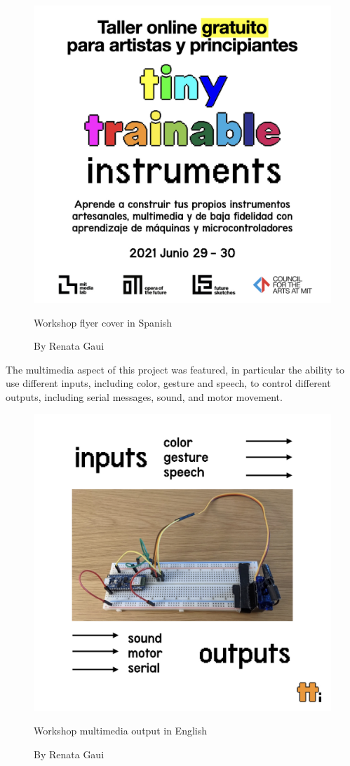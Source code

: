 \begin{figure}[h]
  \centering
  \includegraphics[width=0.75\linewidth,height=0.35\textheight,keepaspectratio]{images/workshop-es-1.jpg}
  \caption{Workshop flyer cover in Spanish}
  \caption*{By Renata Gaui}
  \label{fig:workshop-spanish-flyer-page-1}
\end{figure}

The multimedia aspect of this project was featured, in particular the ability to use different inputs, including color, gesture and speech, to control different outputs, including serial messages, sound, and motor movement.

\begin{figure}[h]
  \centering
  \includegraphics[width=0.75\linewidth,height=0.35\textheight,keepaspectratio]{images/workshop-en-2.jpg}
  \caption{Workshop multimedia output in English}
  \caption*{By Renata Gaui}
  \label{fig:workshop-english-flyer-page-2}
\end{figure}

